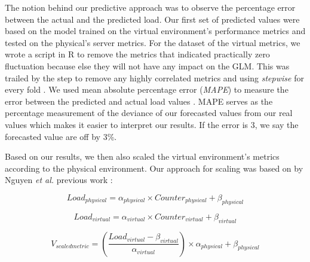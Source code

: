 	The notion behind our predictive approach was to observe the percentage error between the actual and the predicted load. Our first set of predicted values were based on the model trained on the virtual environment's performance metrics and tested on the physical's server metrics. For the dataset of the virtual metrics, we wrote a script in R to remove the metrics that indicated practically zero fluctuation because else they will not have any impact on the GLM. This was trailed by the step to remove any highly correlated metrics and using \textit{stepwise} for every fold \cite{Shihab:2010:UIC:1852786.1852792}. 
	We used mean absolute percentage error (\textit{MAPE}) to measure the error between the predicted and actual load values \cite{mape}. MAPE serves as the percentage measurement of the deviance of our forecasted values from our real values which makes it easier to interpret our results. If the error is 3, we say the forecasted value are off by 3\%. 
	
	Based on our results, we then also scaled the virtual environment's metrics according to the physical environment. Our approach for scaling was based on by Nguyen \textit{et al.} previous work \cite{Nguyen:2012:ADP:2188286.2188344}:
	
	\begin{equation*}
	Load_{physical}= \alpha_{physical} \times Counter_{physical} + \beta_{physical}
	\end{equation*}
	
	\begin{equation*}
	Load_{virtual}= \alpha_{virtual} \times Counter_{virtual} + \beta_{virtual}
	\end{equation*}
	
	\begin{equation}
	V_{scaledmetric} = (\frac{Load_{virtual}-\beta_{virtual}}{\alpha_{virtual}})\times\alpha_{physical}+\beta_{physical}
	\end{equation}
	
